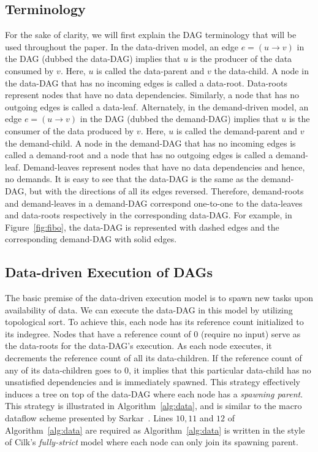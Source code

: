 \documentclass[10pt,conference]{IEEEtran}
\begin{document}
\subsection{Terminology}
\label{sec:terminology}
For the sake of clarity, we will first explain the DAG terminology that will be
used throughout the paper.  In the data-driven model, an edge $e=(u
\rightarrow{} v)$ in the DAG (dubbed the data-DAG) implies that $u$ is the
producer of the data consumed by $v$. Here, $u$ is called the data-parent and
$v$ the data-child.  A node in the data-DAG that has no incoming edges is
called a data-root. Data-roots represent nodes that have no data dependencies.
Similarly, a node that has no outgoing edges is called a data-leaf. 
%
Alternately, in the demand-driven model, an edge $e=(u \rightarrow{} v)$ in the
DAG (dubbed the demand-DAG) implies that $u$ is the consumer of the data
produced by $v$. Here, $u$ is called the demand-parent and $v$ the
demand-child. A node in the demand-DAG that has no incoming edges is called a
demand-root and a node that has no outgoing edges is called a demand-leaf.
Demand-leaves represent nodes that have no data dependencies and hence, no
demands.
%
It is easy to see that the data-DAG is the same as the demand-DAG, but with the
directions of all its edges reversed.  Therefore, demand-roots and
demand-leaves in a demand-DAG correspond one-to-one to the data-leaves and
data-roots respectively in the corresponding data-DAG.  For example, in
Figure~\ref{fig:fibo}, the data-DAG is represented with dashed edges and the
corresponding demand-DAG with solid edges. 

\subsection{Data-driven Execution of DAGs}
The basic premise of the data-driven execution model is to spawn new tasks upon
availability of data.  We can execute the data-DAG in this model by utilizing 
topological sort.  To achieve this, each node has its reference count
initialized to its indegree. Nodes that have a reference count of $0$ (require
no input) serve as the data-roots for the data-DAG's execution.  As each
node executes, it decrements the reference count of all its data-children. If
the reference count of any of its data-children goes to $0$, it implies that
this particular data-child has no unsatisfied dependencies and is immediately
spawned.  This strategy effectively induces a tree on top of the data-DAG where
each node has a \textit{spawning parent}.  This strategy is illustrated in
Algorithm~\ref{alg:data}, and is similar to the macro dataflow scheme presented
by Sarkar~\cite{Sarkar89}.  Lines $10, 11$ and $12$ of Algorithm~\ref{alg:data}
are required as Algorithm~\ref{alg:data} is written in the style of Cilk's
\textit{fully-strict} model where each node can only join its spawning parent.
\end{document}
